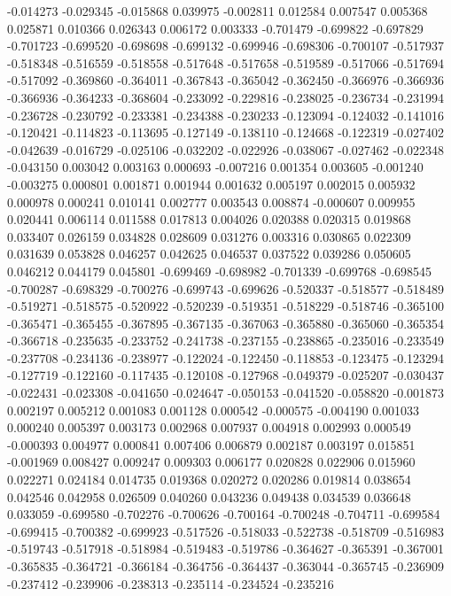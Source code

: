 -0.014273
-0.029345
-0.015868
0.039975
-0.002811
0.012584
0.007547
0.005368
0.025871
0.010366
0.026343
0.006172
0.003333
-0.701479
-0.699822
-0.697829
-0.701723
-0.699520
-0.698698
-0.699132
-0.699946
-0.698306
-0.700107
-0.517937
-0.518348
-0.516559
-0.518558
-0.517648
-0.517658
-0.519589
-0.517066
-0.517694
-0.517092
-0.369860
-0.364011
-0.367843
-0.365042
-0.362450
-0.366976
-0.366936
-0.366936
-0.364233
-0.368604
-0.233092
-0.229816
-0.238025
-0.236734
-0.231994
-0.236728
-0.230792
-0.233381
-0.234388
-0.230233
-0.123094
-0.124032
-0.141016
-0.120421
-0.114823
-0.113695
-0.127149
-0.138110
-0.124668
-0.122319
-0.027402
-0.042639
-0.016729
-0.025106
-0.032202
-0.022926
-0.038067
-0.027462
-0.022348
-0.043150
0.003042
0.003163
0.000693
-0.007216
0.001354
0.003605
-0.001240
-0.003275
0.000801
0.001871
0.001944
0.001632
0.005197
0.002015
0.005932
0.000978
0.000241
0.010141
0.002777
0.003543
0.008874
-0.000607
0.009955
0.020441
0.006114
0.011588
0.017813
0.004026
0.020388
0.020315
0.019868
0.033407
0.026159
0.034828
0.028609
0.031276
0.003316
0.030865
0.022309
0.031639
0.053828
0.046257
0.042625
0.046537
0.037522
0.039286
0.050605
0.046212
0.044179
0.045801
-0.699469
-0.698982
-0.701339
-0.699768
-0.698545
-0.700287
-0.698329
-0.700276
-0.699743
-0.699626
-0.520337
-0.518577
-0.518489
-0.519271
-0.518575
-0.520922
-0.520239
-0.519351
-0.518229
-0.518746
-0.365100
-0.365471
-0.365455
-0.367895
-0.367135
-0.367063
-0.365880
-0.365060
-0.365354
-0.366718
-0.235635
-0.233752
-0.241738
-0.237155
-0.238865
-0.235016
-0.233549
-0.237708
-0.234136
-0.238977
-0.122024
-0.122450
-0.118853
-0.123475
-0.123294
-0.127719
-0.122160
-0.117435
-0.120108
-0.127968
-0.049379
-0.025207
-0.030437
-0.022431
-0.023308
-0.041650
-0.024647
-0.050153
-0.041520
-0.058820
-0.001873
0.002197
0.005212
0.001083
0.001128
0.000542
-0.000575
-0.004190
0.001033
0.000240
0.005397
0.003173
0.002968
0.007937
0.004918
0.002993
0.000549
-0.000393
0.004977
0.000841
0.007406
0.006879
0.002187
0.003197
0.015851
-0.001969
0.008427
0.009247
0.009303
0.006177
0.020828
0.022906
0.015960
0.022271
0.024184
0.014735
0.019368
0.020272
0.020286
0.019814
0.038654
0.042546
0.042958
0.026509
0.040260
0.043236
0.049438
0.034539
0.036648
0.033059
-0.699580
-0.702276
-0.700626
-0.700164
-0.700248
-0.704711
-0.699584
-0.699415
-0.700382
-0.699923
-0.517526
-0.518033
-0.522738
-0.518709
-0.516983
-0.519743
-0.517918
-0.518984
-0.519483
-0.519786
-0.364627
-0.365391
-0.367001
-0.365835
-0.364721
-0.366184
-0.364756
-0.364437
-0.363044
-0.365745
-0.236909
-0.237412
-0.239906
-0.238313
-0.235114
-0.234524
-0.235216
